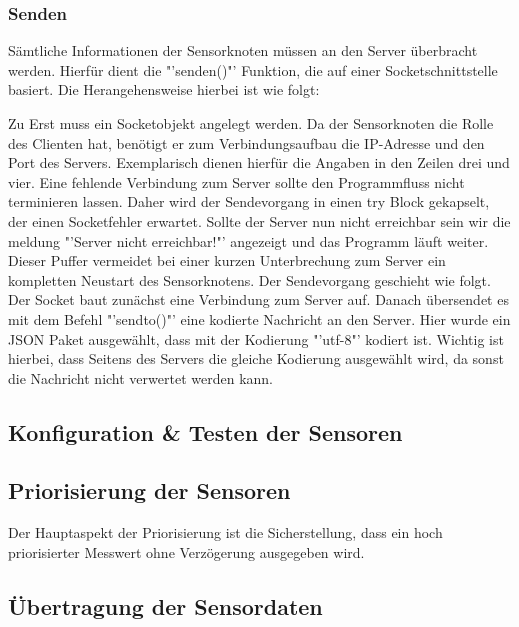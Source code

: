 \subsubsection*{Senden}
	Sämtliche Informationen der Sensorknoten müssen an den Server überbracht werden. Hierfür dient die "'senden()"' Funktion, die auf einer Socketschnittstelle basiert. Die Herangehensweise hierbei ist wie folgt:
	
	Zu Erst muss ein Socketobjekt angelegt werden. Da der Sensorknoten die Rolle des Clienten hat, benötigt er zum Verbindungsaufbau die IP-Adresse und den Port des Servers. Exemplarisch dienen hierfür die Angaben in den Zeilen drei und vier. Eine fehlende Verbindung zum Server sollte den Programmfluss nicht terminieren lassen. Daher wird der Sendevorgang in einen try Block gekapselt, der einen Socketfehler erwartet. Sollte der Server nun nicht erreichbar sein wir die meldung "'Server nicht erreichbar!"' angezeigt und das Programm läuft weiter. Dieser Puffer vermeidet bei einer kurzen Unterbrechung zum Server ein kompletten Neustart des Sensorknotens. Der Sendevorgang geschieht wie folgt. Der Socket baut zunächst eine Verbindung zum Server auf. Danach übersendet es mit dem Befehl "'sendto()"' eine kodierte Nachricht an den Server. Hier wurde ein JSON Paket ausgewählt, dass mit der Kodierung "'utf-8"' kodiert ist. Wichtig ist hierbei, dass Seitens des Servers die gleiche Kodierung ausgewählt wird, da sonst die Nachricht nicht verwertet werden kann. 
\subsection{Konfiguration \& Testen der Sensoren}
\subsection{Priorisierung der Sensoren}
Der Hauptaspekt der Priorisierung ist die Sicherstellung, dass ein hoch priorisierter Messwert ohne Verzögerung ausgegeben wird.
\subsection{Übertragung der Sensordaten}

